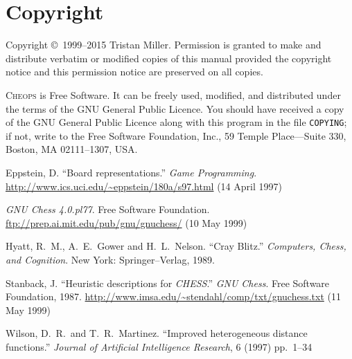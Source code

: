 \documentclass[a4paper]{article}
\begin{document}
\section{Copyright}

Copyright \copyright\ 1999--2015 Tristan Miller.  Permission is
granted to make and distribute verbatim or modified copies of this
manual provided the copyright notice and this permission notice are
preserved on all copies.

\textsc{Cheops} is Free Software. It can be freely used, modified, and
distributed under the terms of the GNU General Public Licence.  You
should have received a copy of the GNU General Public Licence along
with this program in the file \texttt{COPYING}; if not, write to the
Free Software Foundation, Inc., 59 Temple Place---Suite 330, Boston,
MA 02111--1307, USA.

\begin{thebibliography}{99}

 Eppstein, D. ``Board representations.''
  \emph{Game Programming}.
  \url{http://www.ics.uci.edu/~eppstein/180a/s97.html}  (14 April 1997)

 \emph{GNU Chess 4.0.pl77}.  Free Software
  Foundation.  \url{ftp://prep.ai.mit.edu/pub/gnu/gnuchess/} (10 May 1999)

 Hyatt, R.~M., A.~E.~Gower and H.~L.~Nelson.
  ``Cray Blitz.'' \emph{Computers, Chess, and Cognition}.  New York:
  Springer--Verlag, 1989.

 Stanback, J.  ``Heuristic descriptions for
  \emph{CHESS}.''  \emph{GNU Chess}.  Free Software Foundation, 1987.
  \url{http://www.imsa.edu/~stendahl/comp/txt/gnuchess.txt} (11 May 1999)

 Wilson, D.~R.~and T.~R.~Martinez. ``Improved
  heterogeneous distance functions.''  \emph{Journal of Artificial
    Intelligence Research}, 6 (1997) pp.~1--34

\end{thebibliography}
\end{document}
